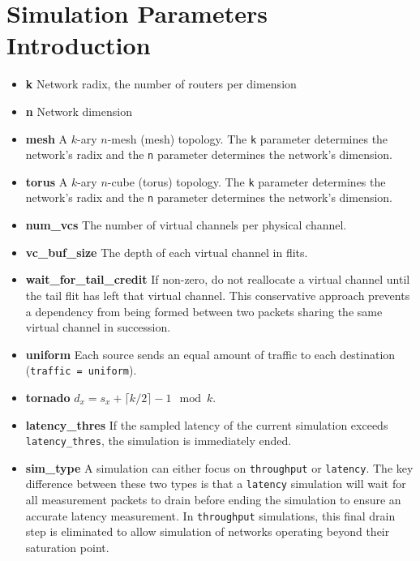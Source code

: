
\chapter{Simulation Parameters Introduction} \label{ch-1}

\begin{itemize}

    
    \item \textbf{k} Network radix, the number of routers per dimension
    
    \item \textbf{n} Network dimension
    
    \item \textbf{mesh} A $k$-ary $n$-mesh (mesh) topology. The \texttt{k} parameter determines the network's radix and the \texttt{n} parameter determines the network's dimension.
    
    \item \textbf{torus} A $k$-ary $n$-cube (torus) topology.  The \texttt{k} parameter determines the network's radix and the \texttt{n} parameter determines the network's dimension.
    
    \item \textbf{num\_vcs} The number of virtual channels per physical channel.
    
    \item \textbf{vc\_buf\_size} The depth of each virtual channel in flits.
    
    \item \textbf{wait\_for\_tail\_credit} If non-zero, do not reallocate a virtual channel until the tail flit has left that virtual channel. This conservative approach prevents a dependency from being formed between two packets sharing the same virtual channel in succession.
    
    \item \textbf{uniform} Each source sends an equal amount of traffic to each destination (\texttt{traffic = uniform}).
    
    \item \textbf{tornado} $d_x = s_x + \lceil k/2 \rceil - 1 \mod k$.
    
    \item \textbf{latency\_thres} If the sampled latency of the current simulation exceeds \texttt{latency\_thres}, the simulation is immediately ended.
    
    \item \textbf{sim\_type} A simulation can either focus on \texttt{throughput} or \texttt{latency}.  The key difference between these two types is that a \texttt{latency} simulation will wait for all measurement packets to drain before ending the simulation to ensure an accurate latency measurement.  In \texttt{throughput} simulations, this final drain step is eliminated to allow simulation of networks operating beyond their saturation point.
    

\end{itemize}
